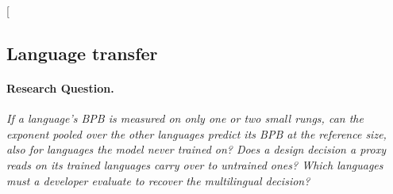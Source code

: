 \clearpage
\twocolumn[{%
\rqparent
\subsection{Language transfer}
\label{app:rq06_language_transfer}

\noindent\begin{minipage}[t]{0.485\textwidth}
\vspace{0pt}
\paragraph{Research Question.} \emph{If a language's BPB is measured on only one or two small rungs, can the exponent pooled over the other languages predict its BPB at the reference size, also for languages the model never trained on? Does a design decision a proxy reads on its trained languages carry over to untrained ones? Which languages must a developer evaluate to recover the multilingual decision?}


\end{minipage}}
